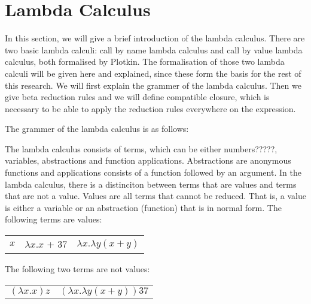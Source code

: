 \chapter{Lambda Calculus}

In this section, we will give a brief introduction of the lambda calculus.
There are two basic lambda calculi: call by name lambda calculus and call by value lambda calculus, both formalised by Plotkin.
The formalisation of those two lambda calculi will be given here and explained, since these form the basis for the rest of this research.
We will first explain the grammer of the lambda calculus. Then we give beta reduction rules and we will define compatible closure, which is necessary to be able to apply the reduction rules everywhere on the expression.

The grammer of the lambda calculus is as  follows:

\vspace{10pt}
\begin{grammar}{
	}
\end{grammar}

\vspace{10pt}
The lambda calculus consists of terms, which can be either numbers?????, variables, abstractions and function applications.
Abstractions are anonymous functions and applications consists of a function followed by an argument.
In the lambda calculus, there is a distinciton between terms that are values and terms that are not a value.
Values are all terms that cannot be reduced. That is, a value is either a variable or an abstraction (function) that is in normal form.
The following terms are values:

\vspace{10pt}
\begin{tabular}{c c c}
	$x$ & \quad $\lambda x. x$ + 37 & \quad $\lambda x.\lambda y (x + y)$
\end{tabular}

\vspace{10pt}
The following two terms are not values:

\vspace{10pt}
\begin{tabular}{c c}
	$(\lambda x. x) z$ & \quad $(\lambda x.\lambda y (x + y))37$
\end{tabular}


